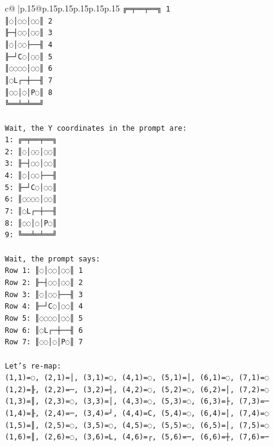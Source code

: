 \documentclass{article}
\begin{document}
{\begin{supertabular}{c@{$\;$}|p{.15\linewidth}@{}p{.15\linewidth}p{.15\linewidth}p{.15\linewidth}p{.15\linewidth}p{.15\linewidth}}
{{{\texttt{╔═╤══╤══╗ 1} \\
\texttt{║◌│◌◌│◌◌║ 2} \\
\texttt{╟─┤◌◌│◌◌║ 3} \\
\texttt{║◌│◌◌├──╢ 4} \\
\texttt{╟─┘C◌│◌◌║ 5} \\
\texttt{║◌◌◌◌│◌◌║ 6} \\
\texttt{║◌L┌─┼──╢ 7} \\
\texttt{║◌◌│◌│P◌║ 8} \\
\texttt{╚══╧═╧══╝} \\
\\ 
\texttt{Wait, the Y coordinates in the prompt are:} \\
\texttt{1: ╔═╤══╤══╗} \\
\texttt{2: ║◌│◌◌│◌◌║} \\
\texttt{3: ╟─┤◌◌│◌◌║} \\
\texttt{4: ║◌│◌◌├──╢} \\
\texttt{5: ╟─┘C◌│◌◌║} \\
\texttt{6: ║◌◌◌◌│◌◌║} \\
\texttt{7: ║◌L┌─┼──╢} \\
\texttt{8: ║◌◌│◌│P◌║} \\
\texttt{9: ╚══╧═╧══╝} \\
\\ 
\texttt{Wait, the prompt says:} \\
\texttt{Row 1: ║◌│◌◌│◌◌║ 1} \\
\texttt{Row 2: ╟─┤◌◌│◌◌║ 2} \\
\texttt{Row 3: ║◌│◌◌├──╢ 3} \\
\texttt{Row 4: ╟─┘C◌│◌◌║ 4} \\
\texttt{Row 5: ║◌◌◌◌│◌◌║ 5} \\
\texttt{Row 6: ║◌L┌─┼──╢ 6} \\
\texttt{Row 7: ║◌◌│◌│P◌║ 7} \\
\\ 
\texttt{Let's re{-}map:} \\
\texttt{(1,1)=◌, (2,1)=│, (3,1)=◌, (4,1)=◌, (5,1)=│, (6,1)=◌, (7,1)=◌} \\
\texttt{(1,2)=╟, (2,2)=─, (3,2)=┤, (4,2)=◌, (5,2)=◌, (6,2)=│, (7,2)=◌} \\
\texttt{(1,3)=║, (2,3)=◌, (3,3)=│, (4,3)=◌, (5,3)=◌, (6,3)=├, (7,3)=─} \\
\texttt{(1,4)=╟, (2,4)=─, (3,4)=┘, (4,4)=C, (5,4)=◌, (6,4)=│, (7,4)=◌} \\
\texttt{(1,5)=║, (2,5)=◌, (3,5)=◌, (4,5)=◌, (5,5)=◌, (6,5)=│, (7,5)=◌} \\
\texttt{(1,6)=║, (2,6)=◌, (3,6)=L, (4,6)=┌, (5,6)=─, (6,6)=┼, (7,6)=─} \\
}}}
\end{supertabular}}
\end{document}
